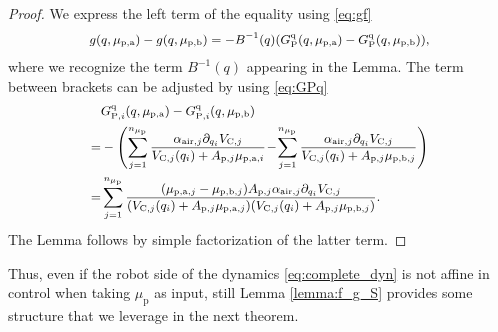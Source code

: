 \begin{proof}
	We express the left term of the equality using \eqref{eq:gf}
	\begin{equation*}\small%
	\begin{split}
	g(q,\mu_{\mathrm{p},\mathrm{a}}) - g(q,\mu_{\mathrm{p},\mathrm{b}}) 
	=-B^{-1}(q) (G_{\mathrm{P}}^{\mathrm{q}}(q,\mu_{\mathrm{p},\mathrm{a}}) - G_{\mathrm{P}}^{\mathrm{q}}(q,\mu_{\mathrm{p},\mathrm{b}})),
	\end{split}
	\end{equation*}
	where we recognize the term $B^{-1}(q)$ appearing in the Lemma. The term between brackets can be adjusted by using \eqref{eq:GPq}
	\begin{equation}\small
	\begin{split}
		&G_{\mathrm{P},i}^{\mathrm{q}}(q,\mu_{\mathrm{p},\mathrm{a}}) - G_{\mathrm{P},i}^{\mathrm{q}}(q,\mu_{\mathrm{p},\mathrm{b}})  \\
	= &-\left(\sum_{j = 1}^{n_{\mu_\mathrm{p}}}  \frac{\alpha_{\mathrm{air},j} \partial_{q_i}V_{\mathrm{C},j}}{V_{\mathrm{C},j}(q_i) + A_{\mathrm{p},j} \mu_{\mathrm{p},\mathrm{a},i}} \!-\! \sum_{j = 1}^{n_{\mu_\mathrm{p}}}  \frac{\alpha_{\mathrm{air},j} \partial_{q_i}V_{\mathrm{C},j}}{V_{\mathrm{C},j}(q_i) + A_{\mathrm{p},j} \mu_{\mathrm{p},\mathrm{b},j}}\right)  \\
	= &\sum_{j = 1}^{n_{\mu_\mathrm{p}}} \frac{ (\mu_{\mathrm{p},\mathrm{a},j} - \mu_{\mathrm{p},\mathrm{b},j})  A_{\mathrm{p},j} \alpha_{\mathrm{air},j} \partial_{q_i}V_{\mathrm{C},j}}{(V_{\mathrm{C},j}(q_i) + A_{\mathrm{p},j} \mu_{\mathrm{p},\mathrm{a},j})(V_{\mathrm{C},j}(q_i) + A_{\mathrm{p},j} \mu_{\mathrm{p},\mathrm{b},j})}.
	\end{split}
	\end{equation}
	The Lemma follows by simple factorization of the latter term.
\end{proof}

Thus, even if the robot side of the dynamics \eqref{eq:complete_dyn} is not affine in control when taking $\mu_\mathrm{p}$ as input, still Lemma \ref{lemma:f_g_S} provides some structure that we leverage in the next theorem.

